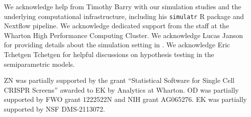 \documentclass[aos]{imsart}
\theoremstyle{plain}
\theoremstyle{remark}
\newcommand{\new}[1]{{\color{darkgreen}{#1}}}
\begin{document}
\begin{acks}[Acknowledgments]
    We acknowledge help from Timothy Barry with our simulation studies and the underlying computational infrastructure, including his \verb|simulatr| R package and Nextflow pipeline. We acknowledge dedicated support from the staff at the Wharton High Performance Computing Cluster. We acknowledge Lucas Janson for providing details about the simulation setting in \citet{CetL16}. We acknowledge Eric Tchetgen Tchetgen for helpful discussions on hypothesis testing in the semiparametric models. \new{Finally, we acknowledge two referees and an associate editor for their insightful comments and suggestions, which helped improve this work.}
    \end{acks}
    \begin{funding}
        ZN was partially supported by the grant ``Statistical Software for Single Cell CRISPR Screens'' awarded to EK by Analytics at Wharton. OD was partially supported by FWO grant 1222522N and NIH grant AG065276. EK was partially supported by NSF DMS-2113072.  
    \end{funding}
    
    
\end{document}
